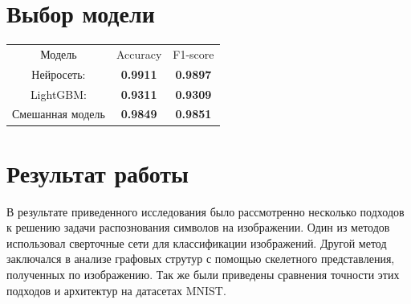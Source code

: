 \documentclass{llncs}
\begin{document}
\section{Выбор модели}
\begin{table}
\label{tabular:timesandtenses}
\begin{center}
\begin{tabular}{ccc}
Модель & Accuracy & F1-score \\
Нейросеть: & \textbf{0.9911} & \textbf{0.9897} \\
LightGBM: & \textbf{0.9311} & \textbf{0.9309} \\
Смешанная модель & \textbf{0.9849} & \textbf{0.9851} \\
\end{tabular}
\end{center}
\end{table}

\section{Результат работы}
В результате приведенного исследования было рассмотренно несколько подходов к решению задачи распознования символов на изображении. Один из методов использовал сверточные сети для классификации изображений. Другой метод заключался в анализе графовых струтур с помощью скелетного представления, полученных по изображению. Так же были приведены сравнения точности этих подходов и архитектур на датасетах MNIST.
\end{document}
